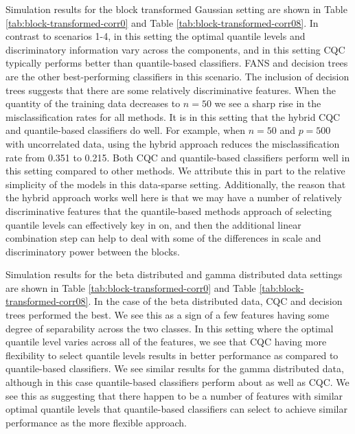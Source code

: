 \documentclass{article}
\begin{document}
Simulation results for the block transformed Gaussian setting are shown in Table
\ref{tab:block-transformed-corr0} and Table \ref{tab:block-transformed-corr08}.
In contrast to scenarios 1-4, in this setting the optimal quantile levels and
discriminatory information vary across the components, and in this setting CQC
typically performs better than quantile-based classifiers.  FANS and decision
trees are the other best-performing classifiers in this scenario.  The inclusion
of decision trees suggests that there are some relatively discriminative
features.  When the quantity of the training data decreases to $n = 50$ we see a
sharp rise in the misclassification rates for all methods.  It is in this
setting that the hybrid CQC and quantile-based classifiers do well.  For
example, when $n = 50$ and $p = 500$ with uncorrelated data, using the hybrid
approach reduces the misclassification rate from 0.351 to 0.215.  Both CQC and
quantile-based classifiers perform well in this setting compared to other
methods.  We attribute this in part to the relative simplicity of the models in
this data-sparse setting.  Additionally, the reason that the hybrid approach
works well here is that we may have a number of relatively discriminative
features that the quantile-based methods approach of selecting quantile levels
can effectively key in on, and then the additional linear combination step can
help to deal with some of the differences in scale and discriminatory power
between the blocks.

Simulation results for the beta distributed and gamma distributed data settings
are shown in Table \ref{tab:block-transformed-corr0} and Table
\ref{tab:block-transformed-corr08}.  In the case of the beta distributed data,
CQC and decision trees performed the best.  We see this as a sign of a few
features having some degree of separability across the two classes.  In this
setting where the optimal quantile level varies across all of the features, we
see that CQC having more flexibility to select quantile levels results in better
performance as compared to quantile-based classifiers.  We see similar results
for the gamma distributed data, although in this case quantile-based classifiers
perform about as well as CQC.  We see this as suggesting that there happen to be
a number of features with similar optimal quantile levels that quantile-based
classifiers can select to achieve similar performance as the more flexible
approach.


\end{document}
